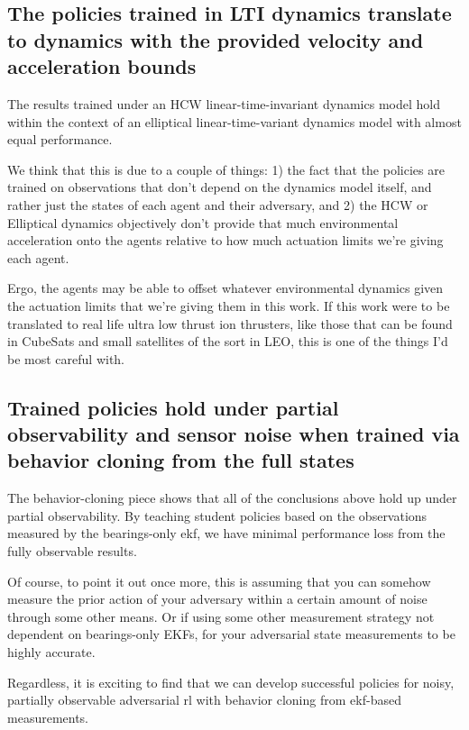 \subsection*{The policies trained in LTI dynamics translate to dynamics with the provided velocity and acceleration bounds}

The results trained under an HCW linear-time-invariant dynamics model hold within the context of an elliptical linear-time-variant dynamics model with almost equal performance. 

We think that this is due to a couple of things: 1) the fact that the policies are trained on observations that don't depend on the dynamics model itself, and rather just the states of each agent and their adversary, and 2) the HCW or Elliptical dynamics objectively don't provide that much environmental acceleration onto the agents relative to how much actuation limits we're giving each agent.

Ergo, the agents may be able to offset whatever environmental dynamics given the actuation limits that we're giving them in this work. If this work were to be translated to real life ultra low thrust ion thrusters, like those that can be found in CubeSats and small satellites of the sort in LEO, this is one of the things I'd be most careful with.


\subsection*{Trained policies hold under partial observability and sensor noise when trained via behavior cloning from the full states}

The behavior-cloning piece shows that all of the conclusions above hold up under partial observability. By teaching student policies based on the observations measured by the bearings-only \acs{ekf}, we have minimal performance loss from the fully observable results.

Of course, to point it out once more, this is assuming that you can somehow measure the prior action of your adversary within a certain amount of noise through some other means. Or if using some other measurement strategy not dependent on bearings-only EKFs, for your adversarial state measurements to be highly accurate.


Regardless, it is exciting to find that we can develop successful policies for noisy, partially observable adversarial \acs{rl} with behavior cloning from \acs{ekf}-based measurements.


